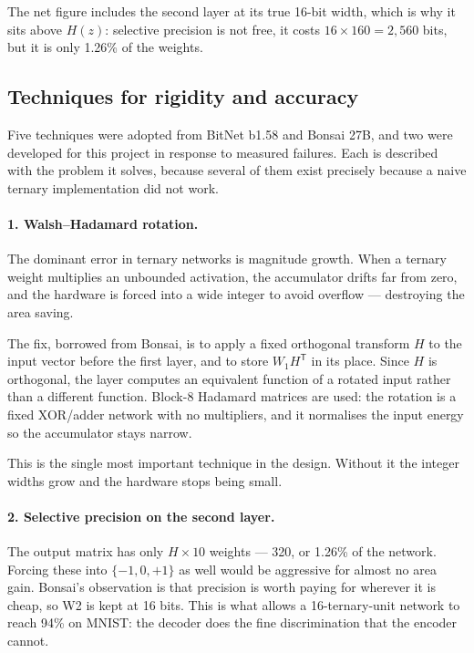 \documentclass[11pt,a4paper]{article}
\begin{document}
The net figure includes the second layer at its true 16-bit width, which is why
it sits above $H(z)$: selective precision is not free, it costs
$16 \times 160 = 2{,}560$ bits, but it is only 1.26\% of the weights.

\subsection{Techniques for rigidity and accuracy}
\label{sec:techniques}

Five techniques were adopted from BitNet b1.58 and Bonsai 27B, and two were
developed for this project in response to measured failures. Each is described
with the problem it solves, because several of them exist precisely because a
naive ternary implementation did not work.

\paragraph{1. Walsh--Hadamard rotation.}
The dominant error in ternary networks is magnitude growth. When a ternary
weight multiplies an unbounded activation, the accumulator drifts far from zero,
and the hardware is forced into a wide integer to avoid overflow --- destroying
the area saving.

The fix, borrowed from Bonsai, is to apply a fixed orthogonal transform $H$ to
the input vector before the first layer, and to store $W_1 H^{\mathsf{T}}$ in its
place. Since $H$ is orthogonal, the layer computes an equivalent function of a
rotated input rather than a different function. Block-8 Hadamard matrices are
used: the rotation is a fixed XOR/adder network with no multipliers, and it
normalises the input energy so the accumulator stays narrow.

This is the single most important technique in the design. Without it the
integer widths grow and the hardware stops being small.

\paragraph{2. Selective precision on the second layer.}
The output matrix has only $H \times 10$ weights --- 320, or 1.26\% of
the network. Forcing these into $\{-1,0,+1\}$ as well would be aggressive for
almost no area gain. Bonsai's observation is that precision is worth paying for
wherever it is cheap, so W2 is kept at 16 bits. This is what allows a
16-ternary-unit network to reach 94\% on MNIST: the decoder does the fine
discrimination that the encoder cannot.
\end{document}
